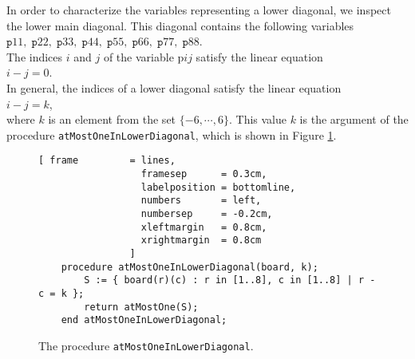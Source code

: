 In order to characterize the variables representing a lower diagonal, we inspect the lower
main diagonal.  This diagonal contains the following variables
\\[0.2cm]
\hspace*{1.3cm} 
$\texttt{p}11,\; \texttt{p}22,\; \texttt{p}33,\; \texttt{p}44,\; \texttt{p}55,\; 
 \texttt{p}66,\; \texttt{p}77,\; \texttt{p}88$. 
\\[0.2cm]
The indices $i$ and $j$ of the variable $\mathrm{p}ij$ satisfy the linear equation 
\\[0.2cm]
\hspace*{1.3cm} 
$i - j = 0$. 
\\[0.2cm]
In general, the indices of a lower diagonal satisfy the linear equation
\\[0.2cm]
\hspace*{1.3cm} 
$i - j = k$, \\[0.2cm]
where $k$ is an element from the set $\{-6, \cdots, 6 \}$.  This value $k$ is the argument
of the procedure  \texttt{atMostOneInLowerDiagonal}, which is shown in Figure
 \ref{fig:atMostOneInLowerDiagonal}.

\begin{figure}[!ht]
  \centering
\begin{Verbatim}[ frame         = lines, 
                  framesep      = 0.3cm, 
                  labelposition = bottomline,
                  numbers       = left,
                  numbersep     = -0.2cm,
                  xleftmargin   = 0.8cm,
                  xrightmargin  = 0.8cm
                ]
    procedure atMostOneInLowerDiagonal(board, k);
        S := { board(r)(c) : r in [1..8], c in [1..8] | r - c = k };
        return atMostOne(S);
    end atMostOneInLowerDiagonal;
\end{Verbatim}
\vspace*{-0.3cm}
  \caption{The procedure \texttt{atMostOneInLowerDiagonal}.}
  \label{fig:atMostOneInLowerDiagonal}
\end{figure}

